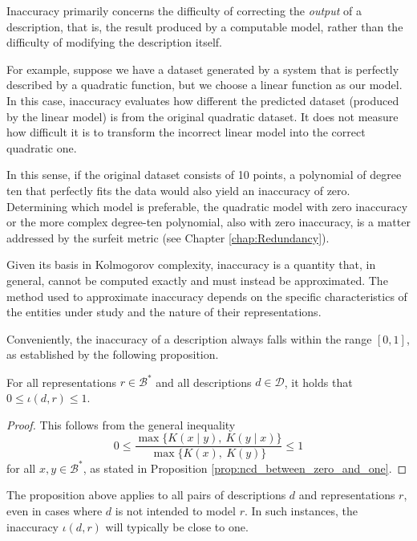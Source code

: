 \begin{example}
Inaccuracy primarily concerns the difficulty of correcting the \emph{output} of a description, that is, the result produced by a computable model, rather than the difficulty of modifying the description itself.

For example, suppose we have a dataset generated by a system that is perfectly described by a quadratic function, but we choose a linear function as our model. In this case, inaccuracy evaluates how different the predicted dataset (produced by the linear model) is from the original quadratic dataset. It does not measure how difficult it is to transform the incorrect linear model into the correct quadratic one.

In this sense, if the original dataset consists of 10 points, a polynomial of degree ten that perfectly fits the data would also yield an inaccuracy of zero. Determining which model is preferable, the quadratic model with zero inaccuracy or the more complex degree-ten polynomial, also with zero inaccuracy, is a matter addressed by the surfeit metric (see Chapter \ref{chap:Redundancy}).
\end{example}

Given its basis in Kolmogorov complexity, inaccuracy is a quantity that, in general, cannot be computed exactly and must instead be approximated. The method used to approximate inaccuracy depends on the specific characteristics of the entities under study and the nature of their representations.

Conveniently, the inaccuracy of a description always falls within the range $[0, 1]$, as established by the following proposition.

\begin{proposition}
\label{prop:inaccuracy:inaccuracy:relative_range}
For all representations $r \in \mathcal{B}^\ast$ and all descriptions $d \in \mathcal{D}$, it holds that $0 \leq \iota(d, r) \leq 1$.
\end{proposition}
\begin{proof}
This follows from the general inequality
\[
0 \leq \frac{ \max\{ K(x \mid y),\ K(y \mid x) \} }{ \max\{ K(x),\ K(y) \} } \leq 1
\]
for all $x, y \in \mathcal{B}^\ast$, as stated in Proposition \ref{prop:ncd_between_zero_and_one}.
\end{proof}

The proposition above applies to all pairs of descriptions $d$ and representations $r$, even in cases where $d$ is not intended to model $r$. In such instances, the inaccuracy $\iota(d, r)$ will typically be close to one.

